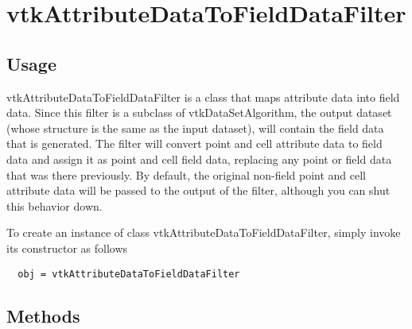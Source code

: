 \section{vtkAttributeDataToFieldDataFilter}

\subsection{Usage}

 vtkAttributeDataToFieldDataFilter is a class that maps attribute data into
 field data. Since this filter is a subclass of vtkDataSetAlgorithm,
 the output dataset (whose structure is the same as the input dataset),
 will contain the field data that is generated. The filter will convert
 point and cell attribute data to field data and assign it as point and
 cell field data, replacing any point or field data that was there
 previously. By default, the original non-field point and cell attribute
 data will be passed to the output of the filter, although you can shut
 this behavior down.

To create an instance of class vtkAttributeDataToFieldDataFilter, simply
invoke its constructor as follows
\begin{verbatim}
  obj = vtkAttributeDataToFieldDataFilter
\end{verbatim}
\subsection{Methods}

